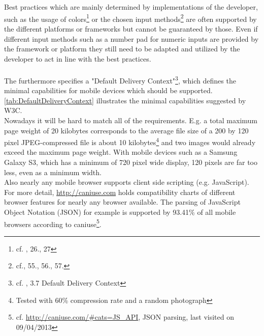 \\
\\
Best practices which are mainly determined by implementations of the developer, such as the usage of colors\footnote{cf. \cite{WorldWideWebConsortium.2008}, 26., 27} or the chosen input methods\footnote{cf.\cite{WorldWideWebConsortium.2008}, 55., 56., 57.} are often supported by the different platforms or frameworks but cannot be guaranteed by those. Even if different input methods such as a number pad for numeric inputs are provided by the framework or platform they still need to be adapted and utilized by the developer to act in line with the best practices.
\\
\\
The \cite{WorldWideWebConsortium.2008} furthermore specifies a "Default Delivery Context"\footnote{cf. \cite{WorldWideWebConsortium.2008}, 3.7 Default Delivery Context}, which defines the minimal capabilities for mobile devices which should be supported. \ref{tab:DefaultDeliveryContext} illustrates the minimal capabilities suggested by W3C.
\\
Nowadays it will be hard to match all of the requirements. E.g. a total maximum page weight of 20 kilobytes corresponds to the average file size of a 200 by 120 pixel JPEG-compressed file is about 10 kilobytes\footnote{Tested with 60\% compression rate and a random photograph} and two images would already exceed the maximum page weight. With mobile devices such as a Samsung Galaxy S3, which has a minimum of 720 pixel wide display, 120 pixels are far too less, even as a minimum width.
\\
Also nearly any mobile browser supports client side scripting (e.g. JavaScript). For more detail, \url{http://caniuse.com} holds compatibility charts of different browser features for nearly any browser available. The parsing of JavaScript Object Notation (JSON) for example is supported by 93.41\% of all mobile browsers according to caniuse\footnote{cf. \url{http://caniuse.com/\#cats=JS_API}, JSON parsing, last visited on 09/04/2013}.
